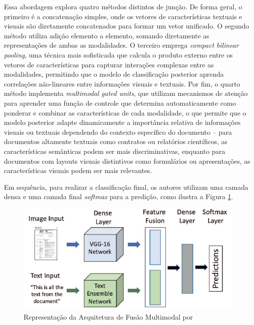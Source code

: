 Essa abordagem explora quatro métodos distintos de junção. De forma geral, o primeiro é a concatenação simples, onde os vetores de características textuais e visuais são diretamente concatenados para formar um vetor unificado. O segundo método utiliza adição elemento a elemento, somando diretamente as representações de ambas as modalidades. O terceiro emprega \textit{compact bilinear pooling}, uma técnica mais sofisticada que calcula o produto externo entre os vetores de características para capturar interações complexas entre as modalidades, permitindo que o modelo de classificação posterior aprenda correlações não-lineares entre informações visuais e textuais. Por fim, o quarto método implementa \textit{multimodal gated units}, que utilizam mecanismos de atenção para aprender uma função de controle que determina automaticamente como ponderar e combinar as características de cada modalidade, o que permite que o modelo posterior adapte dinamicamente a importância relativa de informações visuais ou textuais dependendo do contexto específico do documento -- para documentos altamente textuais como contratos ou relatórios científicos, as características semânticas podem ser mais discriminativas, enquanto para documentos com layouts visuais distintivos como formulários ou apresentações, as características visuais podem ser mais relevantes.

Em sequência, para realizar a classificação final, os autores utilizam uma camada densa e uma camada final \textit{softmax} para a predição, como ilustra a Figura \ref{fig:multimodal}.

\begin{figure}[H]
	\caption{\label{fig:multimodal}Representação da Arquitetura de Fusão Multimodal por \citeauthor*{multimodal}}
    \begin{center}
    \includegraphics[width=1\linewidth]{images/multimodal.png}
	\end{center}
\end{figure}

